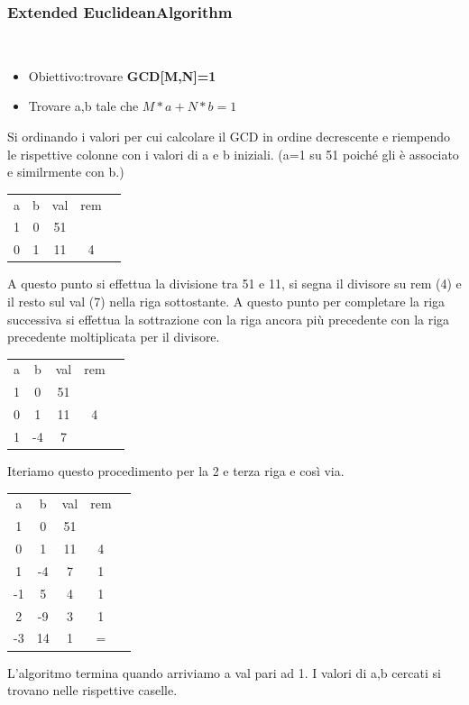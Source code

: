 \documentclass{book}
\theoremstyle{remark}
\begin{document}
\subsubsection{Extended EuclideanAlgorithm}\mbox{}\\
\begin{itemize}
	\item Obiettivo:trovare \textbf{GCD[M,N]=1}
	\item Trovare a,b tale che \(M*a+N*b=1\)
\end{itemize}
Si ordinando i valori per cui calcolare il GCD in ordine decrescente e riempendo le rispettive colonne con i valori di a e b iniziali\@. (a=1 su 51 poiché gli è associato e similrmente con b\@.)
\begin{center}
	\begin{tabular}{|c|c|c|c|c|}
		a & b & val & rem \\
		1 & 0 & 51  &     \\
		0 & 1 & 11  & 4   \\
	\end{tabular}
\end{center}
A questo punto si effettua la divisione tra 51 e 11, si segna il divisore su rem (4) e il resto sul val (7) nella riga sottostante\@. A questo punto per completare la riga successiva si effettua la sottrazione con la riga ancora più precedente con la riga precedente moltiplicata per il divisore\@.
\begin{center}
	\begin{tabular}{|c|c|c|c|c|}
		a & b  & val & rem \\
		1 & 0  & 51  &     \\
		0 & 1  & 11  & 4   \\
		1 & -4 & 7   &     \\
	\end{tabular}
\end{center}
Iteriamo questo procedimento per la 2 e terza riga e così via\@.
\begin{center}
	\begin{tabular}{|c|c|c|c|c|}
		a  & b  & val & rem \\
		1  & 0  & 51  &     \\
		0  & 1  & 11  & 4   \\
		1  & -4 & 7   & 1   \\
		-1 & 5  & 4   & 1   \\
		2  & -9 & 3   & 1   \\
		-3 & 14 & 1   & =   \\
	\end{tabular}
\end{center}
L'algoritmo termina quando arriviamo a val pari ad 1\@. I valori di a,b cercati si trovano nelle rispettive caselle\@.
\end{document}

